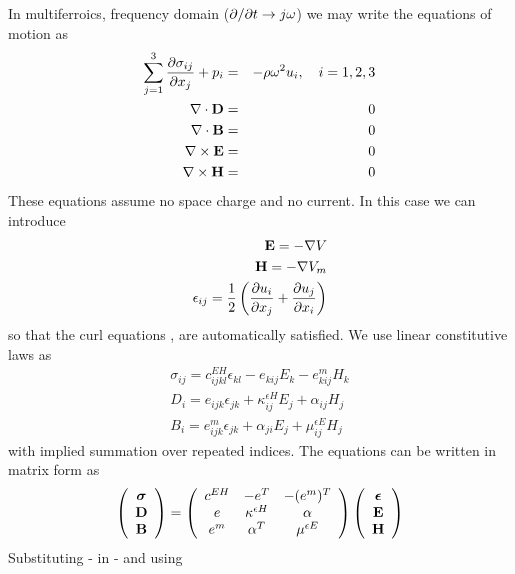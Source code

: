 \documentclass[a4paper,twoside,11pt]{book}
\begin{document}
In multiferroics, frequency domain ($\partial/\partial t\to j\omega$) we may write
the equations of motion as
\begin{eqnarray}
  \sum_{j=1}^3 \frac{\partial \sigma_{ij}}{\partial x_j}+p_i&=&-\rho\omega^2 u_i,~~~i=1,2,3 \label{sigeq}\\
  \nabla\cdot\mathbf{D}&=&0 \label{Deq}\\
  \nabla\cdot\mathbf{B}&=&0 \label{Beq}\\
  \nabla\times\mathbf{E}&=&0 \label{Eeq}\\
  \nabla\times\mathbf{H}&=&0 \label{Heq}
\end{eqnarray}
These equations assume no space charge and no current. In this case we can introduce
\begin{eqnarray}
  \mathbf{E}=-\nabla V \label{V}\\
  \mathbf{H}=-\nabla V_m \label{Vm}\\
  \epsilon_{ij}=\frac12\left(\frac{\partial u_i}{\partial x_j}+\frac{\partial u_j}{\partial x_i}\right)\label{u}
\end{eqnarray}
so that the curl equations ,  are automatically satisfied. We use linear
constitutive laws as
\begin{eqnarray}
  \sigma_{ij}=c^{EH}_{ijkl}\epsilon_{kl}-e_{kij}E_k-e_{kij}^m H_k \label{sigcon}\\
  D_i=e_{ijk}\epsilon_{jk}+\kappa_{ij}^{\epsilon H} E_j+\alpha_{ij}H_{j} \label{Dcon}\\
  B_i=e_{ijk}^m\epsilon_{jk}+\alpha_{ji}E_j+\mu_{ij}^{\epsilon E} H_j \label{Bcon}
\end{eqnarray}
with implied summation over repeated indices. The equations can be
written in matrix form as
\begin{equation}
  \left(\begin{array}{c}
    \mbox{\boldmath $\sigma$}\\
    \mathbf{D}\\
    \mathbf{B}
  \end{array}\right)
=
\left(\begin{array}{ccc}
  c^{EH} & -e^T & -(e^m)^T \\
  e & \kappa^{\epsilon H} & \alpha\\
  e^m & \alpha^T & \mu^{\epsilon E}
\end{array}\right)
\left(\begin{array}{c}
  \mbox{\boldmath $\epsilon$}\\
  \mathbf{E}\\
  \mathbf{H}
\end{array}\right)
\end{equation}
Substituting - in - and using
\end{document}
